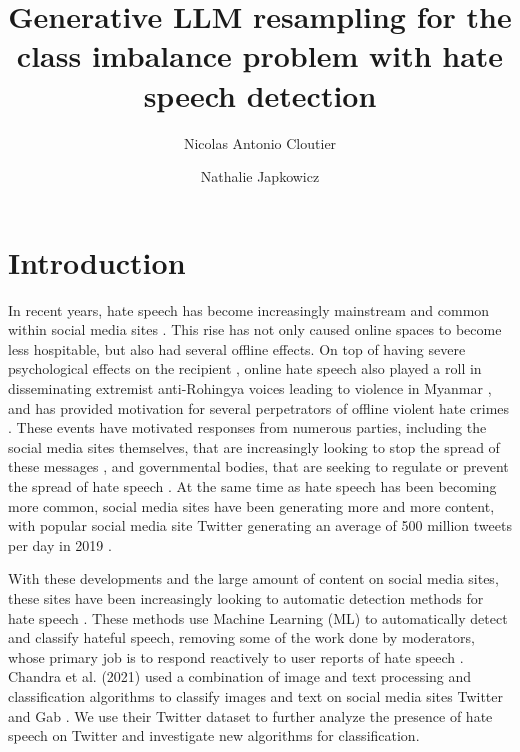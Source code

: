 \documentclass[runningheads]{llncs}
\begin{document}
\title{Generative LLM resampling for the class imbalance problem with hate speech detection}
\author{Nicolas Antonio Cloutier \and Nathalie Japkowicz}



\maketitle 

\begin{abstract}

\end{abstract}

\section{Introduction}
In recent years, hate speech has become increasingly mainstream and common within social media sites \cite{siegel}. This rise has not only caused online spaces to become less hospitable, but also had several offline effects. On top of having severe psychological effects on the recipient \cite{siegel}, online hate speech also played a roll in disseminating extremist anti-Rohingya voices leading to violence in Myanmar \cite{green}, and has provided motivation for several perpetrators of offline violent hate crimes \cite{siegel}. These events have motivated responses from numerous parties, including the social media sites themselves, that are increasingly looking to stop the spread of these messages \cite{ullmann}, and governmental bodies, that are seeking to regulate or prevent the spread of hate speech \cite{banks}. At the same time as hate speech has been becoming more common, social media sites have been generating more and more content, with popular social media site Twitter generating an average of 500 million tweets per day in 2019 \cite{pereira}.

With these developments and the large amount of content on social media sites, these sites have been increasingly looking to automatic detection methods for hate speech \cite{ullmann}. These methods use Machine Learning (ML) to automatically detect and classify hateful speech, removing some of the work done by moderators, whose primary job is to respond reactively to user reports of hate speech \cite{ullmann}. Chandra et al. (2021) used a combination of image and text processing and classification algorithms to classify images and text on social media sites Twitter and Gab \cite{chandra}. We use their Twitter dataset to further analyze the presence of hate speech on Twitter and investigate new algorithms for classification.
\end{document}
